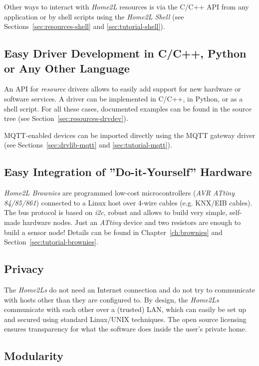 \documentclass[12pt,english,parskip=half,headheight=19pt]{scrreprt}
\begin{document}
Other ways to interact with \textit{Home2L} resources is via the C/C++ API from any application or by shell scripts using the \textit{Home2L Shell} (see Sections~\ref{sec:resources-shell} and \ref{sec:tutorial-shell}).


\subsection*{Easy Driver Development in C/C++, Python or Any Other Language}

An API for \textit{resource} drivers allows to easily add support for new hardware or software services. A driver can be implemented in C/C++, in Python, or as a shell script. For all these cases, documented examples can be found in the source tree (see Section~\ref{sec:resources-drvdev}).

MQTT-enabled devices can be imported directly using the MQTT gateway driver (see Sections~\ref{sec:drvlib-mqtt} and \ref{sec:tutorial-mqtt}).


\subsection*{Easy Integration of ''Do-it-Yourself'' Hardware}

\textit{Home2L Brownies} are programmed low-cost microcontrollers (\textit{AVR ATtiny 84/85/861}) connected to a Linux host over 4-wire cables (e.g. KNX/EIB cables). The bus protocol is based on \textit{i2c}, robust and allows to build very simple, self-made hardware nodes. Just an \textit{ATtiny} device and two resistors are enough to build a sensor node! Details can be found in Chapter~\ref{ch:brownies} and Section~\ref{sec:tutorial-brownies}.


\subsection*{Privacy}

The \textit{Home2Ls} do not need an Internet connection and do not try to communicate with hosts other than they are configured to. By design, the \textit{Home2Ls} communicate with each other over a (trusted) LAN, which can easily be set up and secured using standard Linux/UNIX techniques. The open source licensing ensures transparency for what the software does inside the user's private home.


\subsection*{Modularity}
\end{document}

